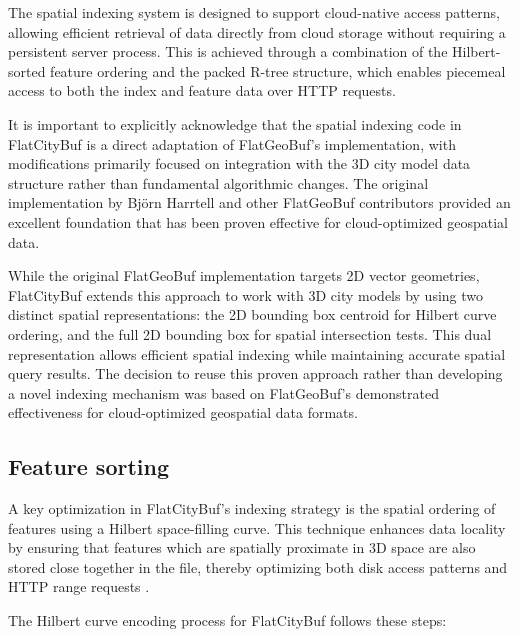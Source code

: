 The spatial indexing system is designed to support cloud-native access patterns, allowing efficient retrieval of data directly from cloud storage without requiring a persistent server process. This is achieved through a combination of the Hilbert-sorted feature ordering and the packed R-tree structure, which enables piecemeal access to both the index and feature data over HTTP requests.

It is important to explicitly acknowledge that the spatial indexing code in FlatCityBuf is a direct adaptation of FlatGeoBuf's implementation, with modifications primarily focused on integration with the 3D city model data structure rather than fundamental algorithmic changes. The original implementation by Björn Harrtell and other FlatGeoBuf contributors \citep{flatgeobuf} provided an excellent foundation that has been proven effective for cloud-optimized geospatial data.

While the original FlatGeoBuf implementation targets 2D vector geometries, FlatCityBuf extends this approach to work with 3D city models by using two distinct spatial representations: the 2D bounding box centroid for Hilbert curve ordering, and the full 2D bounding box for spatial intersection tests. This dual representation allows efficient spatial indexing while maintaining accurate spatial query results. The decision to reuse this proven approach rather than developing a novel indexing mechanism was based on FlatGeoBuf's demonstrated effectiveness for cloud-optimized geospatial data formats.

\subsection{Feature sorting}
\label{methodology:spatial_index:feature_sorting}

A key optimization in FlatCityBuf's indexing strategy is the spatial ordering of features using a Hilbert space-filling curve. This technique enhances data locality by ensuring that features which are spatially proximate in 3D space are also stored close together in the file, thereby optimizing both disk access patterns and HTTP range requests \citep{horance_2022_detail}.

The Hilbert curve encoding process for FlatCityBuf follows these steps:

